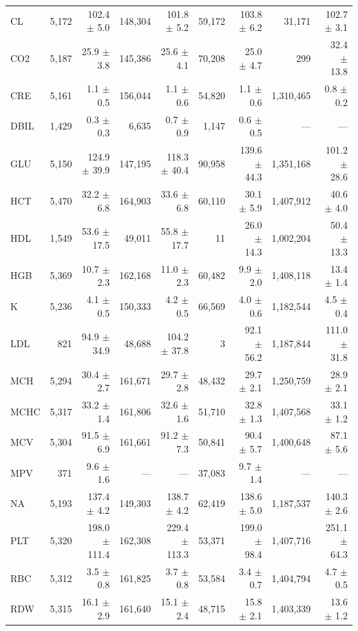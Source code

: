 \begin{table}[ht]
\begin{tabular}{lrrrrrrrr}
CL & 5,172 & 102.4 $\pm$ 5.0 & 148,304 & 101.8 $\pm$ 5.2 & 59,172 & 103.8 $\pm$ 6.2 & 31,171 & 102.7 $\pm$ 3.1 \\
CO2 & 5,187 & 25.9 $\pm$ 3.8 & 145,386 & 25.6 $\pm$ 4.1 & 70,208 & 25.0 $\pm$ 4.7 & 299 & 32.4 $\pm$ 13.8 \\
CRE & 5,161 & 1.1 $\pm$ 0.5 & 156,044 & 1.1 $\pm$ 0.6 & 54,820 & 1.1 $\pm$ 0.6 & 1,310,465 & 0.8 $\pm$ 0.2 \\
DBIL & 1,429 & 0.3 $\pm$ 0.3 & 6,635 & 0.7 $\pm$ 0.9 & 1,147 & 0.6 $\pm$ 0.5 & — & --- \\
GLU & 5,150 & 124.9 $\pm$ 39.9 & 147,195 & 118.3 $\pm$ 40.4 & 90,958 & 139.6 $\pm$ 44.3 & 1,351,168 & 101.2 $\pm$ 28.6 \\
HCT & 5,470 & 32.2 $\pm$ 6.8 & 164,903 & 33.6 $\pm$ 6.8 & 60,110 & 30.1 $\pm$ 5.9 & 1,407,912 & 40.6 $\pm$ 4.0 \\
HDL & 1,549 & 53.6 $\pm$ 17.5 & 49,011 & 55.8 $\pm$ 17.7 & 11 & 26.0 $\pm$ 14.3 & 1,002,204 & 50.4 $\pm$ 13.3 \\
HGB & 5,369 & 10.7 $\pm$ 2.3 & 162,168 & 11.0 $\pm$ 2.3 & 60,482 & 9.9 $\pm$ 2.0 & 1,408,118 & 13.4 $\pm$ 1.4 \\
K & 5,236 & 4.1 $\pm$ 0.5 & 150,333 & 4.2 $\pm$ 0.5 & 66,569 & 4.0 $\pm$ 0.6 & 1,182,544 & 4.5 $\pm$ 0.4 \\
LDL & 821 & 94.9 $\pm$ 34.9 & 48,688 & 104.2 $\pm$ 37.8 & 3 & 92.1 $\pm$ 56.2 & 1,187,844 & 111.0 $\pm$ 31.8 \\
MCH & 5,294 & 30.4 $\pm$ 2.7 & 161,671 & 29.7 $\pm$ 2.8 & 48,432 & 29.7 $\pm$ 2.1 & 1,250,759 & 28.9 $\pm$ 2.1 \\
MCHC & 5,317 & 33.2 $\pm$ 1.4 & 161,806 & 32.6 $\pm$ 1.6 & 51,710 & 32.8 $\pm$ 1.3 & 1,407,568 & 33.1 $\pm$ 1.2 \\
MCV & 5,304 & 91.5 $\pm$ 6.9 & 161,661 & 91.2 $\pm$ 7.3 & 50,841 & 90.4 $\pm$ 5.7 & 1,400,648 & 87.1 $\pm$ 5.6 \\
MPV & 371 & 9.6 $\pm$ 1.6 & — & --- & 37,083 & 9.7 $\pm$ 1.4 & — & --- \\
NA & 5,193 & 137.4 $\pm$ 4.2 & 149,303 & 138.7 $\pm$ 4.2 & 62,419 & 138.6 $\pm$ 5.0 & 1,187,537 & 140.3 $\pm$ 2.6 \\
PLT & 5,320 & 198.0 $\pm$ 111.4 & 162,308 & 229.4 $\pm$ 113.3 & 53,371 & 199.0 $\pm$ 98.4 & 1,407,716 & 251.1 $\pm$ 64.3 \\
RBC & 5,312 & 3.5 $\pm$ 0.8 & 161,825 & 3.7 $\pm$ 0.8 & 53,584 & 3.4 $\pm$ 0.7 & 1,404,794 & 4.7 $\pm$ 0.5 \\
RDW & 5,315 & 16.1 $\pm$ 2.9 & 161,640 & 15.1 $\pm$ 2.4 & 48,715 & 15.8 $\pm$ 2.1 & 1,403,339 & 13.6 $\pm$ 1.2 \\

\end{tabular}
\end{table}
